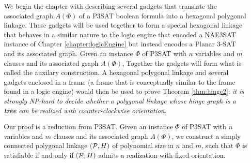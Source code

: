 \documentclass[10pt]{CSUNthesis}
\theoremstyle{plain}%
\theoremstyle{definition}
\theoremstyle{remark}
\renewcommand{\PP}{{\cal P}} %
\begin{document}

We begin the chapter with describing several gadgets that translate the associated graph $A(\Phi)$ of a P3SAT boolean formula into a hexagonal polygonal linkage.  
These gadgets will be used together to form a special hexagonal linkage that behaves in a similar nature to the logic engine that encoded a NAE3SAT instance of Chapter \ref{chapter:logicEngine} but instead encodes a Planar 3-SAT and its associated graph.  
Given an instance $\Phi$ of P3SAT with $n$ variables and $m$ clauses and its associated graph $A(\Phi)$, 
Together the gadgets will form what is called the auxilary construction.
A hexagonal polygonal linkage and several gadgets enclosed in a frame (a frame that is conceptually similar to the frame found in a logic engine) would then be used to prove Theorem \ref{thm:hinge2}: \textit{it is strongly NP-hard to decide whether a polygonal linkage whose hinge graph is a \textbf{tree} can be realized with counter-clockwise orientation.}

Our proof is a reduction from P3SAT.
Given an instance $\Phi$ of P3SAT with $n$ variables and $m$ clauses and its associated graph $A(\Phi)$, we construct a simply connected polygonal linkage $(\PP,H)$ of polynomial size in $n$ and $m$, such that $\Phi$ is satisfiable if and only if $(\PP,H)$ admits a realization with fixed orientation. 
\end{document}
